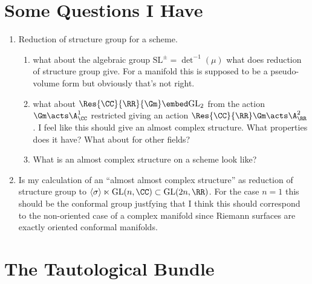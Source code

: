 \documentclass[12pt]{article}
\begin{document}
\section{Some Questions I Have}

\begin{enumerate}
\item Reduction of structure group for a scheme.
\begin{enumerate}
\item what about the algebraic group $\mathrm{SL}^{\pm} = \det^{-1}(\mu)$ what does reduction of structure group give. For a manifold this is supposed to be a pseudo-volume form but obviously that's not right.
\item what about $\Res{\CC}{\RR}{\Gm} \embed \mathrm{GL}_2$ from the action $\Gm \acts \A^1_{\CC}$ restricted giving an action $\Res{\CC}{\RR} \Gm \acts \A^2_{\RR}$. I feel like this should give an almost complex structure. What properties does it have? What about for other fields?
\item What is an almost complex structure on a scheme look like?
\end{enumerate}
\item Is my calculation of an ``almost almost complex structure'' as reduction of structure group to $\left< \sigma \right> \ltimes \mathrm{GL}(n, \CC) \subset \mathrm{GL}(2n, \RR)$. For the case $n = 1$ this should be the conformal group justfying that I think this should correspond to the non-oriented case of a complex manifold since Riemann surfaces are exactly oriented conformal manifolds.
\end{enumerate}

\section{The Tautological Bundle}

\renewcommand{\C}{\mathbb{C}}
\newcommand{\Span}[1]{\mathrm{Span}\left( #1 \right)}
\end{document}
